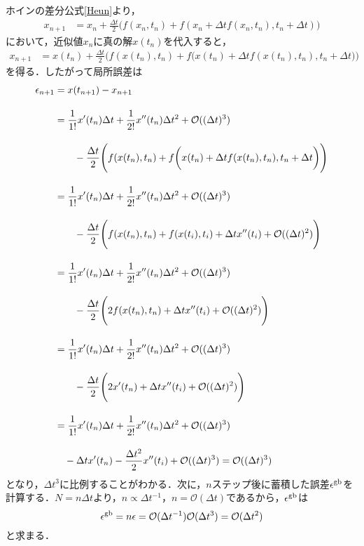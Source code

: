 ホインの差分公式\eqref{Heun}より，
\begin{align}
	x_{n+1}&=x_n+\frac{\Delta t}{2}\Biggl(
	f(x_n,t_n)
	+f(x_n+\Delta t f(x_n,t_n), t_n + \Delta t)
	\Biggr)
\end{align}
において，近似値$x_n$に真の解$x(t_n)$を代入すると，
\begin{align}
	x_{n+1}&=x(t_n)+\frac{\Delta t}{2}\Biggl(
	f(x(t_n),t_n)
	+f\biggl(
	x(t_n)+\Delta t f(x(t_n),t_n), t_n + \Delta t
	\biggr)
	\Biggr)
\end{align}
を得る．したがって局所誤差は
\begin{align}
	\epsilon_{n+1}&=x(t_{n+1})-x_{n+1}\nn[10pt]
	&=\frac{1}{1!}x^{\prime}(t_n)\Delta t +\frac{1}{2!}x^{\prime\prime}(t_n)\Delta t^2+\mathcal{O}((\Delta t)^3)\nn[10pt]
	&\hspace{20pt}-\frac{\Delta t}{2}\Biggl(
	f(x(t_n),t_n)
	+f\biggl(
	x(t_n)+\Delta t f(x(t_n),t_n), t_n + \Delta t
	\biggr)
	\Biggr)\nn[10pt]
	&=\frac{1}{1!}x^{\prime}(t_n)\Delta t +\frac{1}{2!}x^{\prime\prime}(t_n)\Delta t^2+\mathcal{O}((\Delta t)^3)\nn[10pt]
	&\hspace{20pt}-\frac{\Delta t}{2}\Biggl(
	f(x(t_n),t_n)+
	f(x(t_i),t_i)+\Delta tx^{\prime\prime}(t_i) + \mathcal{O}((\Delta t)^2)
	\Biggr)\nn[10pt]
	&=\frac{1}{1!}x^{\prime}(t_n)\Delta t +\frac{1}{2!}x^{\prime\prime}(t_n)\Delta t^2+\mathcal{O}((\Delta t)^3)\nn[10pt]
	&\hspace{20pt}-\frac{\Delta t}{2}\Biggl(
	2f(x(t_n),t_n)+\Delta tx^{\prime\prime}(t_i) + \mathcal{O}((\Delta t)^2)
	\Biggr)\nn[10pt]
	&=\frac{1}{1!}x^{\prime}(t_n)\Delta t +\frac{1}{2!}x^{\prime\prime}(t_n)\Delta t^2+\mathcal{O}((\Delta t)^3)\nn[10pt]
	&\hspace{20pt}-\frac{\Delta t}{2}\Biggl(
	2x^{\prime}(t_n)+\Delta tx^{\prime\prime}(t_i) + \mathcal{O}((\Delta t)^2)
	\Biggr)\nn[10pt]
	&=\frac{1}{1!}x^{\prime}(t_n)\Delta t +\frac{1}{2!}x^{\prime\prime}(t_n)\Delta t^2+\mathcal{O}((\Delta t)^3)\nn[10pt]
	&\hspace{10pt}-\Delta t x^{\prime}(t_n)
	-\frac{\Delta t^2}{2}x^{\prime\prime}(t_i) + \mathcal{O}((\Delta t)^3)
	= \mathcal{O}((\Delta t)^3)
\end{align}
となり，$\Delta t^3$に比例することがわかる．次に，$n$ステップ後に蓄積した誤差$\epsilon^{\rm{gb}}$を計算する．$N=n\Delta t$より，$n \propto \Delta t^{-1}$，$n=\mathcal{O}(\Delta t)$であるから，$\epsilon^{\rm{gb}}$は
\begin{equation}
	\epsilon^{\rm{gb}}=n\epsilon
	=\mathcal{O}(\Delta t^{-1})\mathcal{O}(\Delta t^3)
	=\mathcal{O}(\Delta t^2)
\end{equation}
と求まる．


